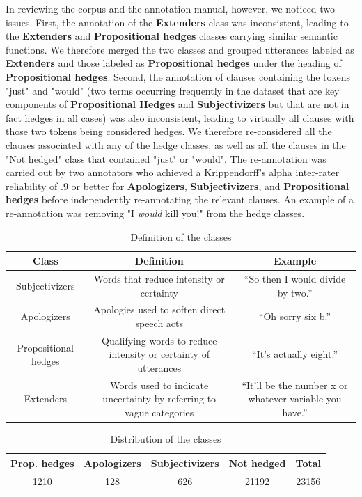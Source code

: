 \documentclass[11pt]{article}
\begin{document}
\noindent In reviewing the corpus and the annotation manual, however, we noticed two issues. First, the annotation of the  \textbf{Extenders} class was inconsistent, leading to the \textbf{Extenders} and \textbf{Propositional hedges} classes carrying similar semantic functions.  We therefore merged the two classes and grouped utterances labeled as \textbf{Extenders} and those labeled as \textbf{Propositional hedges} under the heading of \textbf{Propositional hedges}. 
Second, the annotation of clauses containing the tokens "just" and "would" (two terms occurring frequently in the dataset that are key components of \textbf{Propositional Hedges} and \textbf{Subjectivizers} but that are not in fact hedges in all cases) was also inconsistent, leading to virtually all clauses with those two tokens being considered hedges. We therefore re-considered all the clauses associated with any of the hedge classes, as well as all the clauses in the "Not hedged" class that contained "just" or "would". The re-annotation was carried out by two annotators who achieved a Krippendorff's alpha inter-rater  reliability of .9 or better for \textbf{Apologizers}, \textbf{Subjectivizers}, and \textbf{Propositional hedges} before independently re-annotating the relevant clauses. An example of a re-annotation was removing "I \textit{would} kill you!" from the hedge classes. 


\begin{table}
  \scriptsize
  \centering
  \setlength{\tabcolsep}{2pt}
  \begin{tabular}{@{}ccc@{}} \toprule
    Class & Definition & Example\\ \midrule
    Subjectivizers & Words that reduce intensity or certainty & “So then I would divide by two.” \\ 
    Apologizers & Apologies used to soften direct speech acts & “Oh sorry six b.” \\
    Propositional hedges & Qualifying words to reduce intensity or certainty of utterances & “It's actually eight.” \\
    Extenders & Words used to indicate uncertainty by referring to vague categories & “It'll be the number x or whatever variable you have.” \\ \bottomrule
  \end{tabular}
  \caption{Definition of the classes}
  \label{tab:2}
\end{table}

\noindent 

\begin{table}[htbp]
  \small
  \centering
  \setlength{\tabcolsep}{2pt}
  \begin{tabular}{@{}ccccc@{}} \toprule
    Prop. hedges & Apologizers & Subjectivizers & Not hedged & Total\\ \midrule
    1210 & 128 & 626 & 21192 & 23156 \\ \midrule
  \end{tabular}
  \caption{Distribution of the classes}
  \label{tab:1}
\end{table}
\end{document}
